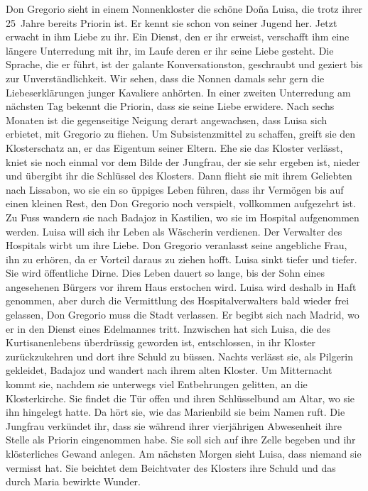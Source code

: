 Don Gregorio sieht in einem Nonnenkloster die schöne Doña Luisa,
die trotz ihrer 25~Jahre bereits Priorin ist. Er kennt sie schon von
seiner Jugend her. Jetzt erwacht in ihm Liebe zu ihr. Ein Dienst, den
er ihr erweist, verschafft ihm eine längere Unterredung mit ihr, im
Laufe deren er ihr seine Liebe gesteht. Die Sprache, die er führt, ist
der galante Konversationston, geschraubt und geziert bis zur
Unverständlichkeit. Wir sehen, dass die Nonnen damals sehr gern die
Liebeserklärungen junger Kavaliere anhörten. In einer zweiten
Unterredung am nächsten Tag bekennt die Priorin, dass sie seine Liebe
erwidere. Nach sechs Monaten ist die gegenseitige Neigung derart
angewachsen, dass Luisa sich erbietet, mit Gregorio zu fliehen. Um
Subsistenzmittel zu schaffen, greift sie den Klosterschatz an, er das
Eigentum seiner Eltern. Ehe sie das Kloster verlässt, kniet sie noch
einmal vor dem Bilde der Jungfrau, der sie sehr ergeben ist, nieder und
übergibt ihr die Schlüssel des Klosters. Dann flieht sie mit ihrem
Geliebten nach Lissabon, wo sie ein so üppiges Leben führen, dass
ihr Vermögen bis auf einen kleinen Rest, den Don Gregorio noch verspielt,
vollkommen aufgezehrt ist. Zu Fuss wandern sie nach Badajoz
in Kastilien, wo sie im Hospital aufgenommen werden. Luisa will sich
ihr Leben als Wäscherin verdienen. Der Verwalter des Hospitals wirbt
um ihre Liebe. Don Gregorio veranlasst seine angebliche Frau, ihn zu
erhören, da er Vorteil daraus zu ziehen hofft. Luisa sinkt tiefer und
tiefer. Sie wird öffentliche Dirne. Dies Leben dauert so lange, bis der
Sohn eines angesehenen Bürgers vor ihrem Haus erstochen wird. Luisa
wird deshalb in Haft genommen, aber durch die Vermittlung des
Hospitalverwalters bald wieder frei gelassen, Don Gregorio muss die
Stadt verlassen. Er begibt sich nach Madrid, wo er in den Dienst
eines Edelmannes tritt. Inzwischen hat sich Luisa, die des Kurtisanenlebens
überdrüssig geworden ist, entschlossen, in ihr Kloster zurückzukehren
und dort ihre Schuld zu büssen. Nachts verlässt sie, als
Pilgerin gekleidet, Badajoz und wandert nach ihrem alten Kloster. Um
Mitternacht kommt sie, nachdem sie unterwegs viel Entbehrungen
gelitten, an die Klosterkirche. Sie findet die Tür offen und ihren
Schlüsselbund am Altar, wo sie ihn hingelegt hatte. Da hört sie, wie
das Marienbild sie beim Namen ruft. Die Jungfrau verkündet ihr, dass
sie während ihrer vierjährigen Abwesenheit ihre Stelle als Priorin eingenommen
habe. Sie soll sich auf ihre Zelle begeben und ihr klösterliches
Gewand anlegen. Am nächsten Morgen sieht Luisa, dass niemand
sie vermisst hat. Sie beichtet dem Beichtvater des Klosters ihre Schuld
und das durch Maria bewirkte Wunder.

